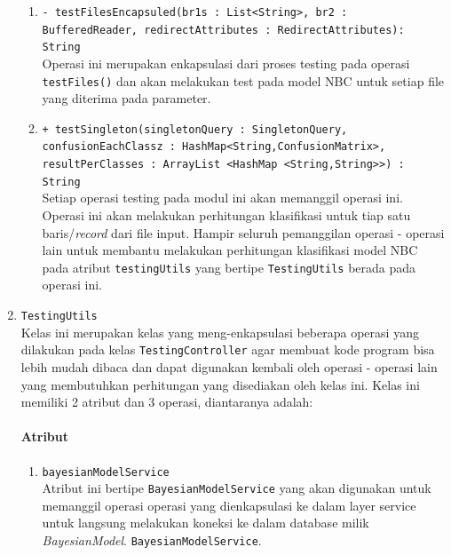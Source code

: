 \begin{enumerate}
\begin{enumerate}
			\item \texttt{- testFilesEncapsuled(br1s : List<String>, br2 : BufferedReader, redirectAttributes : RedirectAttributes): String}\\
			Operasi ini merupakan enkapsulasi dari proses testing pada operasi \texttt{testFiles()} dan akan melakukan test pada model NBC untuk setiap file yang diterima pada parameter.


			\item \texttt{+ testSingleton(singletonQuery : SingletonQuery, confusionEachClassz : HashMap<String,ConfusionMatrix>, resultPerClasses : ArrayList <HashMap <String,String>>) : String}\\
			Setiap operasi testing pada modul ini akan memanggil operasi ini. Operasi ini akan melakukan perhitungan klasifikasi untuk tiap satu baris/\textit{record} dari file input. Hampir seluruh pemanggilan operasi - operasi lain untuk membantu melakukan perhitungan klasifikasi model NBC pada atribut \texttt{testingUtils} yang bertipe \texttt{TestingUtils} berada pada operasi ini.

		\end{enumerate}
		
	
	\item \texttt{TestingUtils}\\
	Kelas ini merupakan kelas yang meng-enkapsulasi beberapa operasi yang dilakukan pada kelas \texttt{TestingController} agar membuat kode program bisa lebih mudah dibaca dan dapat digunakan kembali oleh operasi - operasi lain yang membutuhkan perhitungan yang disediakan oleh kelas ini. Kelas ini memiliki 2 atribut dan 3 operasi, diantaranya adalah:
	\paragraph{Atribut}
		\begin{enumerate}
			\item \texttt{bayesianModelService}\\
			Atribut ini bertipe \texttt{BayesianModelService} yang akan digunakan untuk memanggil operasi operasi yang dienkapsulasi ke dalam layer service untuk langsung melakukan koneksi ke dalam database milik \textit{BayesianModel}. \texttt{BayesianModelService}.
			
		\end{enumerate}				


\end{enumerate}
